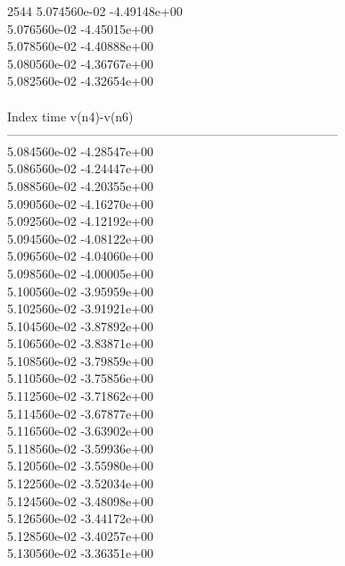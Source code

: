 2544	5.074560e-02	-4.49148e+00	\\ 	5.076560e-02	-4.45015e+00	\\ 	5.078560e-02	-4.40888e+00	\\ 	5.080560e-02	-4.36767e+00	\\ 	5.082560e-02	-4.32654e+00	\\ \hline
\\ \hline
Index   time            v(n4)-v(n6)     \\ \hline
--------------------------------------------------------------------------------\\ 	5.084560e-02	-4.28547e+00	\\ 	5.086560e-02	-4.24447e+00	\\ 	5.088560e-02	-4.20355e+00	\\ 	5.090560e-02	-4.16270e+00	\\ 	5.092560e-02	-4.12192e+00	\\ 	5.094560e-02	-4.08122e+00	\\ 	5.096560e-02	-4.04060e+00	\\ 	5.098560e-02	-4.00005e+00	\\ 	5.100560e-02	-3.95959e+00	\\ 	5.102560e-02	-3.91921e+00	\\ 	5.104560e-02	-3.87892e+00	\\ 	5.106560e-02	-3.83871e+00	\\ 	5.108560e-02	-3.79859e+00	\\ 	5.110560e-02	-3.75856e+00	\\ 	5.112560e-02	-3.71862e+00	\\ 	5.114560e-02	-3.67877e+00	\\ 	5.116560e-02	-3.63902e+00	\\ 	5.118560e-02	-3.59936e+00	\\ 	5.120560e-02	-3.55980e+00	\\ 	5.122560e-02	-3.52034e+00	\\ 	5.124560e-02	-3.48098e+00	\\ 	5.126560e-02	-3.44172e+00	\\ 	5.128560e-02	-3.40257e+00	\\ 	5.130560e-02	-3.36351e+00	\\ \hline

